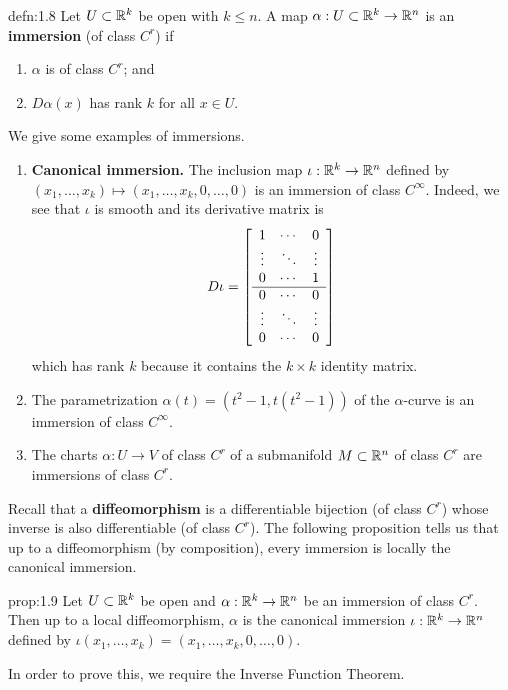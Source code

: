\begin{defn}{defn:1.8}
    Let $U \subset \mathbb{R}^k$ be open with $k \leq n$. A map $\alpha : U 
    \subset \mathbb{R}^k \to \mathbb{R}^n$ is an {\bf immersion} (of class $C^r$) if 
    \begin{enumerate}[(1)]
        \item $\alpha$ is of class $C^r$; and 
        \item $D\alpha(x)$ has rank $k$ for all $x \in U$. 
    \end{enumerate}
\end{defn}\vspace{-0.25cm}
We give some examples of immersions. 
\begin{enumerate}[(1)]
    \item {\bf Canonical immersion.} The inclusion map $\iota : \mathbb{R}^k \to \mathbb{R}^n$ defined by 
    $(x_1, \dots, x_k) \mapsto (x_1, \dots, x_k, 0, \dots, 0)$
    is an immersion of class $C^\infty$.
    Indeed, we see that $\iota$ is smooth and its derivative matrix is
    \[ D\iota = \mleft[ \begin{array}{ccc}
        1 & \cdots & 0 \\ 
        \vdots & \ddots & \vdots \\ 
        0 & \cdots & 1 \\ \hline 
        0 & \cdots & 0 \\ 
        \vdots & \ddots & \vdots \\ 
        0 & \cdots & 0 \\ 
    \end{array} \mright] \]
    which has rank $k$ because it contains the $k \times k$ identity matrix.

    \item The parametrization $\alpha(t) = (t^2 - 1, t(t^2 - 1))$ of the 
    $\alpha$-curve is an immersion of class $C^\infty$. 
    
    \item The charts $\alpha : U \to V$ of class $C^r$ of a submanifold 
    $M \subset \mathbb{R}^n$ of class $C^r$ are immersions of class $C^r$. 
\end{enumerate}
Recall that a {\bf diffeomorphism} is a differentiable bijection 
(of class $C^r$) whose inverse is also differentiable (of class $C^r$). The 
following proposition tells us that up to a diffeomorphism (by composition), 
every immersion is locally the canonical immersion.

\begin{prop}{prop:1.9}
    Let $U \subset \mathbb{R}^k$ be open and $\alpha : \mathbb{R}^k \to \mathbb{R}^n$ be an immersion 
    of class $C^r$. Then up to a local diffeomorphism, $\alpha$ is the 
    canonical immersion $\iota : \mathbb{R}^k \to \mathbb{R}^n$ defined by 
    $\iota(x_1, \dots, x_k) = (x_1, \dots, x_k, 0, \dots, 0)$. 
\end{prop}\vspace{-0.25cm}
In order to prove this, we require the Inverse Function Theorem. 

